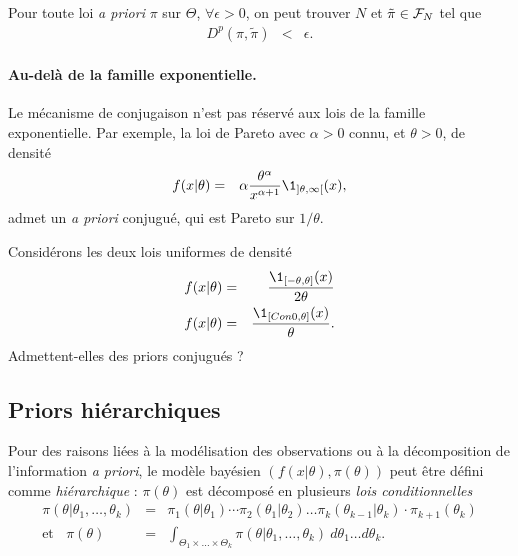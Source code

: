 \begin{theorem}
Pour toute loi {\it a priori} $\pi$ sur $\Theta$, 
$\forall \epsilon>0$, on peut trouver $N$ et $\tilde{\pi}\in{\cal{F}}_N$ tel que
\begin{eqnarray*}
D^p(\pi,\tilde{\pi}) & < & \epsilon. 
\end{eqnarray*}
\end{theorem}

\paragraph{Au-delà de la famille exponentielle.} Le mécanisme de conjugaison n'est pas réservé aux lois de la famille exponentielle. Par exemple, la loi de Pareto avec $\alpha>0$ connu, et $\theta>0$, de densité
\begin{eqnarray*}
f(x|\theta) & = & \alpha\frac{\theta^\alpha}{x^{\alpha+1}}\1_{]\theta,\infty[}(x),
\end{eqnarray*}
admet un {\it a priori} conjugué, qui est Pareto sur $1/\theta$. 

\begin{exec}
Considérons les deux lois uniformes de densité
\begin{eqnarray*}
f(x|\theta) & = & \frac{\1_{[-\theta,\theta]}(x)}{2\theta} \\
f(x|\theta) & = & \frac{\1_{[Con0,\theta]}(x)}{\theta}.
\end{eqnarray*}
Admettent-elles des priors conjugués ?
\end{exec}



\subsection{Priors hiérarchiques}

Pour des raisons liées à la modélisation des observations ou à la décomposition de l'information {\it a priori}, le modèle bayésien $(f(x|\theta), \pi(\theta))$ peut \^etre défini comme \emph{hiérarchique} : $\pi(\theta)$ est décomposé en plusieurs {\it lois conditionnelles}
\begin{eqnarray*}
{\pi(\theta|\theta_1,\ldots,\theta_{k})} & = & {\pi_1(\theta|\theta_1)\cdots\pi_2(\theta_1|\theta_2)\ldots \pi_k(\theta_{k-1}|\theta_k)\cdot\pi_{k+1}(\theta_k)} \\
\text{et} \ \ \ \ \pi(\theta) & = & \int_{\Theta_1\times\ldots\times\Theta_k} \pi(\theta|\theta_1,\ldots,\theta_{k}) \ d\theta_1\ldots d\theta_k. \\
\end{eqnarray*}

